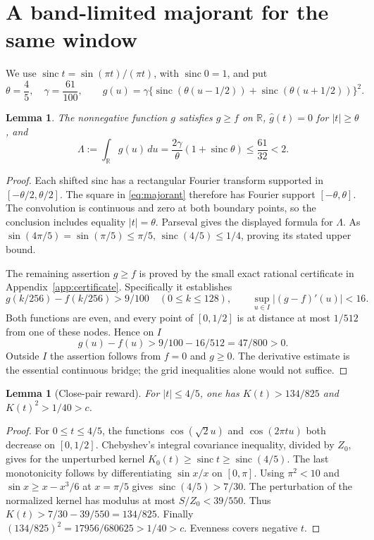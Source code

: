 \documentclass[11pt,a4paper]{article}
\newtheorem{lemma}[theorem]{Lemma}
\theoremstyle{remark}
\DeclareMathOperator{\sinc}{sinc}
\newcommand{\R}{\mathbb R}
\begin{document}
\section{A band-limited majorant for the same window}

We use $\sinc t=\sin(\pi t)/(\pi t)$, with $\sinc0=1$, and put
\begin{equation}\label{eq:majorant}
 \theta=\frac45,\quad \gamma=\frac{61}{100},\qquad
 g(u)=\gamma\{\sinc(\theta(u-1/2))+
                    \sinc(\theta(u+1/2))\}^2.
\end{equation}

\begin{lemma}\label{lem:majorant}
The nonnegative function $g$ satisfies $g\ge f$ on $\R$,
$\widehat g(t)=0$ for $|t|\ge\theta$, and
\begin{equation}\label{eq:mass}
 \Lambda:=\int_\R g(u)\,du
 =\frac{2\gamma}{\theta}(1+\sinc\theta)
 \le\frac{61}{32}<2 .
\end{equation}
\end{lemma}
\begin{proof}
Each shifted sinc has a rectangular Fourier transform supported in
$[-\theta/2,\theta/2]$. The square in \eqref{eq:majorant}
therefore has Fourier support $[-\theta,\theta]$.
The convolution is continuous and zero at both boundary points,
so the conclusion includes equality $|t|=\theta$.
Parseval gives the displayed formula for $\Lambda$.
As $\sin(4\pi/5)=\sin(\pi/5)\le\pi/5$,
$\sinc(4/5)\le1/4$, proving its stated upper bound.

The remaining assertion $g\ge f$ is proved by the small exact
rational certificate in Appendix~\ref{app:certificate}.
Specifically it establishes
\[
 g(k/256)-f(k/256)>9/100 \quad(0\le k\le128),
 \qquad \sup_{u\in I}|(g-f)'(u)|<16.
\]
Both functions are even, and every point of $[0,1/2]$ is at
distance at most $1/512$ from one of these nodes. Hence on $I$
\[
 g(u)-f(u)>9/100-16/512=47/800>0.
\]
Outside $I$ the assertion follows from $f=0$ and $g\ge0$.
The derivative estimate is the essential continuous bridge;
the grid inequalities alone would not suffice.
\end{proof}

\begin{lemma}[Close-pair reward]\label{lem:close}
For $|t|\le4/5$, one has $K(t)>134/825$ and
$K(t)^2>1/40>c$.
\end{lemma}
\begin{proof}
For $0\le t\le4/5$, the functions $\cos(\sqrt2u)$ and
$\cos(2\pi tu)$ both decrease on $[0,1/2]$.
Chebyshev's integral covariance inequality, divided by $Z_0$,
gives for the unperturbed kernel $K_0(t)\ge\sinc t\ge\sinc(4/5)$.
The last monotonicity follows by differentiating $\sin x/x$ on
$[0,\pi]$. Using $\pi^2<10$ and
$\sin x\ge x-x^3/6$ at $x=\pi/5$ gives
$\sinc(4/5)>7/30$.
The perturbation of the normalized kernel has modulus at most
$S/Z_0<39/550$. Thus
$K(t)>7/30-39/550=134/825$.
Finally $(134/825)^2=17956/680625>1/40>c$.
Evenness covers negative $t$.
\end{proof}
\end{document}
